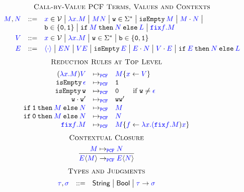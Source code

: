 \documentclass{article}
\begin{document}
	
\begin{figure}
	\[
	\begin{array}{rcl}
	\multicolumn{3}{c}{\textsc{Call-by-Value PCF Terms, Values and Contexts}}\\[5pt]
	\Tm,\Tmtwo&\grameq&\Var\in\mathcal{V} \grampipe \La\Var\Tm \grampipe \Tm\Tmtwo  \grampipe \wo\in\Sigma^*\grampipe \isempty\Tm\grampipe\cons\Tm\Tmtwo\grampipe\\
	&&\bool\in\{\zero,\one\}\grampipe \ite\Tm\Tmtwo\Tmthree \grampipe \Fix\F\Tm\\[3pt]
	\Va&\grameq&\Var\in\mathcal{V}\grampipe\La\Var\Tm \grampipe\wo\in\Sigma^*\grampipe\bool\in\{\zero,\one\}\\[3pt]
	\Ctx&\grameq&\Hole\grampipe\Ctx\Tmtwo\grampipe\Va\Ctx\grampipe\isempty\Ctx\grampipe\cons\Ctx\Tmtwo\grampipe\cons\Va\Ctx\grampipe\ite\Ctx\Tmtwo\Tmthree
	\end{array}
	\]
	\[
	\begin{array}{rcl}
	\multicolumn{3}{c}{\textsc{Reduction Rules at Top Level}}\\[5pt]
	(\La\Var\Tm)\Va&\tlpcf&\Tm\isub\Var\Va\\
	\isempty\Ems&\tlpcf&\one\\
	\isempty\wo&\tlpcf&\zero\qquad\textrm{if }\wo\neq\Ems\\
	\cons\wo\wotwo&\tlpcf&\wo\wotwo\\
	\ite\one\Tm\Tmtwo&\tlpcf&\Tm\\
	\ite\zero\Tm\Tmtwo&\tlpcf&\Tmtwo\\
	\Fix\F\Tm&\tlpcf&\Tm\isub{\F}{\La\Var(\Fix\F\Tm)\Var}
	\end{array}
	\]
	\[
	\begin{array}{c}
	\textsc{Contextual Closure}\\[5pt]
	\infer{\Ctxp\Tm\topcf\Ctxp\Tmtwo}{\Tm\tlpcf\Tmtwo}
	\end{array}
	\]
	\[
	\begin{array}{rcl}
	\multicolumn{3}{c}{\textsc{Types and Judgments}}\\[5pt]
	\Ty,\Tytwo&\grameq&\Str\grampipe\Bool\grampipe\Ty\to\Tytwo
	\end{array}
	\]
\end{figure}
\end{document}
